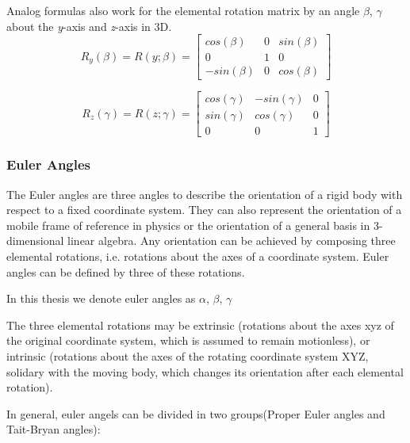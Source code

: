 Analog formulas also work for the elemental rotation matrix by an angle $\beta$, $\gamma$ about the \textit{y}-axis and \textit{z}-axis in 3D.
\begin{equation*}
R_y(\beta) = R(y;\beta)
      = \begin{bmatrix} cos(\beta) & 0 & sin(\beta)\\
                        0 & 1 & 0\\
                        -sin(\beta) & 0 & cos(\beta) \end{bmatrix}                
\end{equation*}
 
\begin{equation*}
R_z(\gamma) = R(z;\gamma)
      = \begin{bmatrix} cos(\gamma) & -sin(\gamma) & 0\\
                        sin(\gamma) & cos(\gamma) & 0\\
                        0 & 0 & 1 \end{bmatrix}                
\end{equation*}

\subsubsection{Euler Angles}
The Euler angles are three angles to describe the orientation of a rigid body with respect to a fixed coordinate system. They can also represent the orientation of a mobile frame of reference in physics or the orientation of a general basis in 3-dimensional linear algebra. Any orientation can be achieved by composing three elemental rotations, i.e. rotations about the axes of a coordinate system. Euler angles can be defined by three of these rotations.%

In this thesis we denote euler angles as $\alpha$, $\beta$, $\gamma$

The three elemental rotations may be extrinsic (rotations about the axes xyz of the original coordinate system, which is assumed to remain motionless), or intrinsic (rotations about the axes of the rotating coordinate system XYZ, solidary with the moving body, which changes its orientation after each elemental rotation).%

In general, euler angels can be divided in two groups(Proper Euler angles and Tait-Bryan angles):

